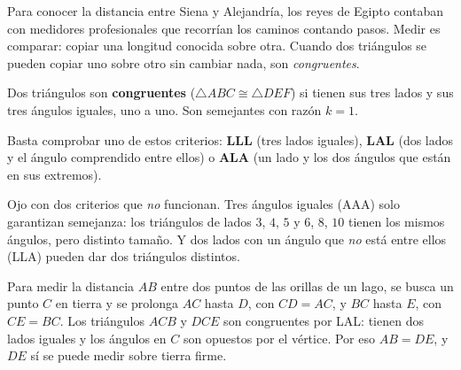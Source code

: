 \documentclass[11pt]{article}
\begin{document}
\label{tema:congruencia}

\begin{hilo}
Para conocer la distancia entre Siena y Alejandría, los reyes de Egipto contaban
con medidores profesionales que recorrían los caminos contando pasos. Medir es
comparar: copiar una longitud conocida sobre otra. Cuando dos triángulos se pueden
copiar uno sobre otro sin cambiar nada, son \emph{congruentes}.
\end{hilo}

\begin{definicion}
Dos triángulos son \textbf{congruentes} ($\triangle ABC \cong \triangle DEF$) si
tienen sus tres lados y sus tres ángulos iguales, uno a uno. Son semejantes con
razón $k = 1$.
\end{definicion}

\begin{teorema}
Basta comprobar uno de estos criterios:
\textbf{LLL} (tres lados iguales), \textbf{LAL} (dos lados y el ángulo comprendido
entre ellos) o \textbf{ALA} (un lado y los dos ángulos que están en sus extremos).
\end{teorema}

Ojo con dos criterios que \emph{no} funcionan. Tres ángulos iguales (AAA) solo
garantizan semejanza: los triángulos de lados $3$, $4$, $5$ y $6$, $8$, $10$ tienen
los mismos ángulos, pero distinto tamaño. Y dos lados con un ángulo que \emph{no} está
entre ellos (LLA) pueden dar dos triángulos distintos.

\begin{ejemplo}
Para medir la distancia $AB$ entre dos puntos de las orillas de un lago, se busca un
punto $C$ en tierra y se prolonga $AC$ hasta $D$, con $CD = AC$, y $BC$ hasta $E$,
con $CE = BC$. Los triángulos $ACB$ y $DCE$ son congruentes por LAL: tienen dos lados
iguales y los ángulos en $C$ son opuestos por el vértice. Por eso $AB = DE$, y $DE$
sí se puede medir sobre tierra firme.
\begin{center}
\end{center}
\end{ejemplo}
\end{document}
